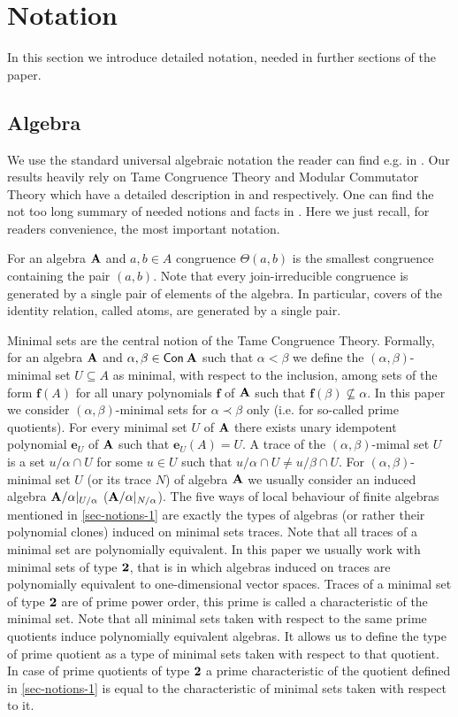 \documentclass[11pt,a4paper]{amsart}
\newcommand{\m}[1]{{\uppercase {\bf{#1}}}}
\newcommand{\con}[1]{{\sf Con\:\m{#1}}}
\newcommand{\po}[1]{{\mathbf {#1}}}
\newcommand{\tn} [1]{{\bf {#1}}}
\begin{document}
\section{Notation}

In this section we introduce detailed notation, needed in further sections of the paper.
\subsection*{Algebra} 
We use the standard universal algebraic notation the reader can find e.g. in \cite{BurrisSankappanavar}. Our results heavily rely on Tame Congruence Theory and Modular Commutator Theory which have a detailed description in \cite{hm} and \cite{fm} respectively. One can find the not too long summary of needed notions and facts  in \cite[Section 2]{IdziakK22}. Here we just recall, for readers convenience, the most important notation.


 For an algebra $\m A$ and $a,b\in A$ congruence $\Theta(a,b)$ is the smallest congruence containing the pair $(a,b)$. Note that every join-irreducible congruence is generated by a single pair of elements of the algebra. In particular, covers of the identity relation, called atoms, are generated by a single pair. 

 Minimal sets are the central notion of the Tame Congruence Theory. Formally, for an algebra $\m A$ and $\alpha,\beta\in \con {\m A}$ such that $\alpha < \beta$ we define the $(\alpha,\beta)$-minimal set $U\subseteq A$ as minimal, with respect to the inclusion, among sets of the form $\po f(A)$ for all unary polynomials  $\po f$ of  $\m A$ such that $\po f(\beta)\not\subseteq\alpha$. In this paper we consider $(\alpha,\beta)$-minimal sets for $\alpha\prec\beta$ only (i.e. for so-called prime quotients).  For every minimal set $U$ of $\m A$ there exists unary idempotent polynomial $\po e_U$ of $\m A$ such that $\po e_U(A)=U$. A trace of the $(\alpha,\beta)$-mimal set $U$ is a set $u/\alpha\cap U$ for some $u\in U$ such that $u/\alpha\cap U\not=u/\beta\cap U$. For $(\alpha, \beta)$-minimal set $U$ (or its trace $N$) of algebra $\m A$ we usually consider an induced algebra $\m A/\alpha|_{U/\alpha}$ ($\m A/\alpha|_{N/\alpha}$). The five ways of local behaviour of finite algebras mentioned in \cref{sec-notions-1} are exactly the types of algebras (or rather their polynomial clones) induced on minimal sets traces. Note that all traces of a minimal set are polynomially equivalent. In this paper we usually work with minimal sets of type $\tn 2$, that is in which algebras induced on traces are polynomially equivalent to one-dimensional vector spaces. Traces of a minimal set of type $\tn 2$ are of prime power order, this prime is called a characteristic of the minimal set. Note that all minimal sets taken with respect to the same prime quotients induce polynomially equivalent algebras. It allows us to define the type of prime quotient as a type of minimal sets taken with respect to that quotient. In case of prime quotients of type $\tn 2$ a prime characteristic of the quotient defined in \cref{sec-notions-1} is equal to the characteristic of minimal sets taken with respect to it.
\end{document}
